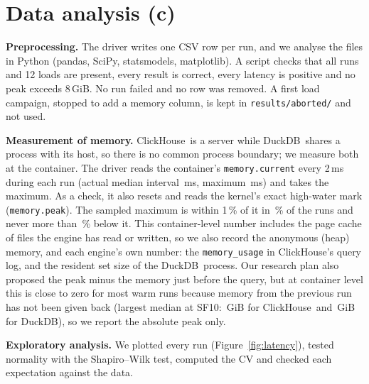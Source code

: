 \documentclass[11pt,a4paper]{article}
\newcommand{\CH}{ClickHouse}
\newcommand{\DK}{DuckDB}
\begin{document}
\section{Data analysis (c)}

\textbf{Preprocessing.} The driver writes one CSV row per run, and we analyse the files in Python (pandas, SciPy, statsmodels, matplotlib). A script checks that all  runs and 12 loads are present, every result is correct, every latency is positive and no peak exceeds 8\,GiB. No run failed and no row was removed.
A first load campaign, stopped to add a memory column, is kept in \texttt{results/aborted/} and not used.

\textbf{Measurement of memory.} \CH\ is a server while \DK\ shares a process with its host, so there is no common process boundary; we measure both at the container.
The driver reads the container's \texttt{memory.current} every 2\,ms during each run (actual median interval \,ms, maximum \,ms) and takes the maximum.
As a check, it also resets and reads the kernel's exact high-water mark (\texttt{memory.peak}).
The sampled maximum is within 1\,\% of it in \,\% of the runs and never more than \,\% below it.
This container-level number includes the page cache of files the engine has read or written, so we also record the anonymous (heap) memory, and each engine's own number: the \texttt{memory\_usage} in \CH's query log, and the resident set size of the \DK\ process.
Our research plan also proposed the peak minus the memory just before the query, but at container level this is close to zero for most warm runs because memory from the previous run has not been given back (largest median at SF10: \,GiB for \CH\ and \,GiB for \DK), so we report the absolute peak only.

\textbf{Exploratory analysis.} We plotted every run (Figure~\ref{fig:latency}), tested normality with the Shapiro--Wilk test, computed the CV and checked each expectation against the data.
\end{document}
